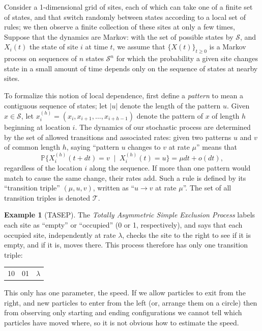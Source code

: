 \documentclass{article}
\renewcommand{\P}{\mathbb{P}}
\newcommand{\calS}{\mathcal{S}}  %
\newcommand{\calT}{\mathcal{T}}  %
\newcommand{\given}{\;\mid\;}
\theoremstyle{plain}
\theoremstyle{definition}
\newtheorem{example}{Example}[section]
\begin{document}
Consider a 1-dimensional grid of sites, each of which can take one of a finite set of states,
and that switch randomly between states according to a local set of rules;
we then observe a finite collection of these sites at only a few times,
Suppose that the dynamics are Markov:
with the set of possible states by $\calS$,
and $X_i(t)$ the state of site $i$ at time $t$,
we assume that $\{X(t)\}_{t \ge 0}$ is a Markov process on sequences of $n$ states $\calS^n$
for which the probability a given site changes state in a small amount of time
depends only on the sequence of states at nearby sites.

To formalize this notion of local dependence,
first define a \textit{pattern} to mean a contiguous sequence of states;
let $|u|$ denote the length of the pattern $u$.
Given $x \in \calS$,
let $x_i^{(h)} = (x_i, x_{i+1}, \ldots, x_{i+h-1})$ denote the pattern of $x$ of length $h$ beginning at location $i$.
The dynamics of our stochastic process are determined by the set of allowed transitions and associated rates:
given two patterns $u$ and $v$ of common length $h$,
saying ``pattern $u$ changes to $v$ at rate $\mu$'' means that
\[
    \P\{ X_i^{(h)}(t+dt) = v \given X_i^{(h)}(t) = u \} = \mu dt + o(dt),
\]
regardless of the location $i$ along the sequence.
If more than one pattern would match to cause the same change, their rates add.
Such a rule is defined by its ``transition triple'' $(\mu,u,v)$,
written as ``$u \to v$ at rate $\mu$''.
The set of all transition triples is denoted $\calT$.

\begin{example}[TASEP]
  The \emph{Totally Asymmetric Simple Exclusion Process} labels each site as ``empty'' or ``occupied'' (0 or 1, respectively),
  and says that each occupied site, independently at rate $\lambda$, checks the site to the right to see if it is empty,
  and if it is, moves there.
  This process therefore has only one transition triple:

  \begin{center}
    \begin{tabular}{c@{\quad$\to$\quad}c@{\quad at rate\quad }c}
      10  &   01   &  $\lambda$
    \end{tabular}
  \end{center}

  This only has one parameter, the speed.
  If we allow particles to exit from the right, and new particles to enter from the left
  (or, arrange them on a circle)
  then from observing only starting and ending configurations
  we cannot tell which particles have moved where,
  so it is not obvious how to estimate the speed.

\end{example}
\end{document}
